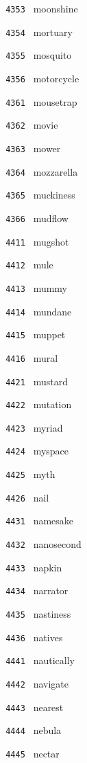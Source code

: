 \documentclass[11pt]{article}
\begin{document}
\begin{multicols}{6}
\noindent \texttt{ 4353 } moonshine  \par
\noindent \texttt{ 4354 } mortuary  \par
\noindent \texttt{ 4355 } mosquito  \par
\noindent \texttt{ 4356 } motorcycle  \par
\noindent \texttt{ 4361 } mousetrap  \par
\noindent \texttt{ 4362 } movie  \par
\noindent \texttt{ 4363 } mower  \par
\noindent \texttt{ 4364 } mozzarella  \par
\noindent \texttt{ 4365 } muckiness  \par
\noindent \texttt{ 4366 } mudflow  \par
\noindent \texttt{ 4411 } mugshot  \par
\noindent \texttt{ 4412 } mule  \par
\noindent \texttt{ 4413 } mummy  \par
\noindent \texttt{ 4414 } mundane  \par
\noindent \texttt{ 4415 } muppet  \par
\noindent \texttt{ 4416 } mural  \par
\noindent \texttt{ 4421 } mustard  \par
\noindent \texttt{ 4422 } mutation  \par
\noindent \texttt{ 4423 } myriad  \par
\noindent \texttt{ 4424 } myspace  \par
\noindent \texttt{ 4425 } myth  \par
\noindent \texttt{ 4426 } nail  \par
\noindent \texttt{ 4431 } namesake  \par
\noindent \texttt{ 4432 } nanosecond  \par
\noindent \texttt{ 4433 } napkin  \par
\noindent \texttt{ 4434 } narrator  \par
\noindent \texttt{ 4435 } nastiness  \par
\noindent \texttt{ 4436 } natives  \par
\noindent \texttt{ 4441 } nautically  \par
\noindent \texttt{ 4442 } navigate  \par
\noindent \texttt{ 4443 } nearest  \par
\noindent \texttt{ 4444 } nebula  \par
\noindent \texttt{ 4445 } nectar  \par

\end{multicols}
\end{document}
